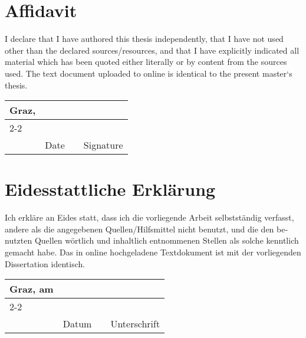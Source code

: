 
\section*{Affidavit}

I declare that I have authored this thesis independently, that I have
not used other than the declared sources/resources, and that I have
explicitly indicated all material which has been quoted either
literally or by content from the sources used. The text document
uploaded to online is identical to the present master‘s
thesis.

\vfill

\newcommand{\mysignatureblock}[3]{%
  \begin{tabular}{llp{2em}l}
  #1 & \hspace{5cm}        & & \hspace{6cm} \\\cline{2-2}\cline{4-4}
     &                     & & \\[-3mm]
     & {\footnotesize #2}  & & {\footnotesize #3}
  \end{tabular}
}

\mysignatureblock{Graz,}{Date}{Signature}

\vfill
\vfill
\vfill
\vfill

\section*{Eidesstattliche Erklärung}

\foreignlanguage{ngerman}{%
  Ich erkläre an Eides statt, dass ich die vorliegende Arbeit
  selbstständig verfasst, andere als die angegebenen
  Quellen/Hilfsmittel nicht benutzt, und die den benutzten Quellen
  wörtlich und inhaltlich entnommenen Stellen als solche kenntlich
  gemacht habe. Das in online hochgeladene Textdokument
  ist mit der vorliegenden Dissertation identisch.}

\vfill

\mysignatureblock{Graz, am}{Datum}{Unterschrift}


\newpage
\newpage

